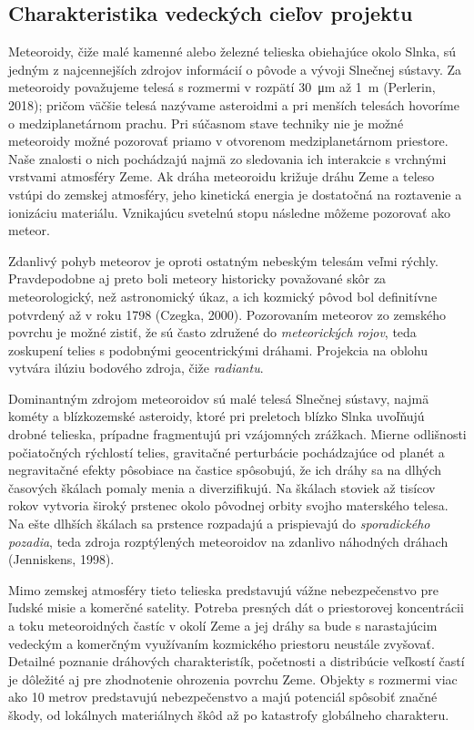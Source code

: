 \subsection{Charakteristika vedeckých cieľov
projektu}\label{charakteristika-vedeckuxfdch-cieux13eov-projektu}

Meteoroidy, čiže malé kamenné alebo železné telieska obiehajúce okolo
Slnka, sú jedným z najcennejších zdrojov informácií o pôvode a vývoji
Slnečnej sústavy. Za meteoroidy považujeme telesá s rozmermi v rozpätí
\SI{30}{\micro\metre} až \SI{1}{\metre} (Perlerin, 2018); pričom väčšie
telesá nazývame asteroidmi a pri menších telesách hovoríme o
medziplanetárnom prachu. Pri súčasnom stave techniky nie je možné
meteoroidy možné pozorovať priamo v otvorenom medziplanetárnom
priestore. Naše znalosti o nich pochádzajú najmä zo sledovania ich
interakcie s vrchnými vrstvami atmosféry Zeme. Ak dráha meteoroidu
križuje dráhu Zeme a teleso vstúpi do zemskej atmosféry, jeho kinetická
energia je dostatočná na roztavenie a ionizáciu materiálu. Vznikajúcu
svetelnú stopu následne môžeme pozorovať ako meteor.

Zdanlivý pohyb meteorov je oproti ostatným nebeským telesám veľmi
rýchly. Pravdepodobne aj preto boli meteory historicky považované skôr
za meteorologický, než astronomický úkaz, a ich kozmický pôvod bol
definitívne potvrdený až v roku 1798 (Czegka, 2000). Pozorovaním
meteorov zo zemského povrchu je možné zistiť, že sú často združené do
\emph{meteorických rojov}, teda zoskupení telies s podobnými
geocentrickými dráhami. Projekcia na oblohu vytvára ilúziu bodového
zdroja, čiže \emph{radiantu}.

Dominantným zdrojom meteoroidov sú malé telesá Slnečnej sústavy, najmä
kométy a blízkozemské asteroidy, ktoré pri preletoch blízko Slnka
uvoľňujú drobné telieska, prípadne fragmentujú pri vzájomných zrážkach.
Mierne odlišnosti počiatočných rýchlostí telies, gravitačné perturbácie
pochádzajúce od planét a negravitačné efekty pôsobiace na častice
spôsobujú, že ich dráhy sa na dlhých časových škálach pomaly menia a
diverzifikujú. Na škálach stoviek až tisícov rokov vytvoria široký
prstenec okolo pôvodnej orbity svojho materského telesa. Na ešte dlhších
škálach sa prstence rozpadajú a prispievajú do \emph{sporadického
pozadia}, teda zdroja rozptýlených meteoroidov na zdanlivo náhodných
dráhach (Jenniskens, 1998).

Mimo zemskej atmosféry tieto telieska predstavujú vážne nebezpečenstvo
pre ľudské misie a komerčné satelity. Potreba presných dát o
priestorovej koncentrácii a toku meteoroidných častíc v okolí Zeme a jej
dráhy sa bude s narastajúcim vedeckým a komerčným využívaním kozmického
priestoru neustále zvyšovať. Detailné poznanie dráhových charakteristík,
početnosti a distribúcie veľkostí častí je dôležité aj pre zhodnotenie
ohrozenia povrchu Zeme. Objekty s rozmermi viac ako 10 metrov
predstavujú nebezpečenstvo a majú potenciál spôsobiť značné škody, od
lokálnych materiálnych škôd až po katastrofy globálneho charakteru.

